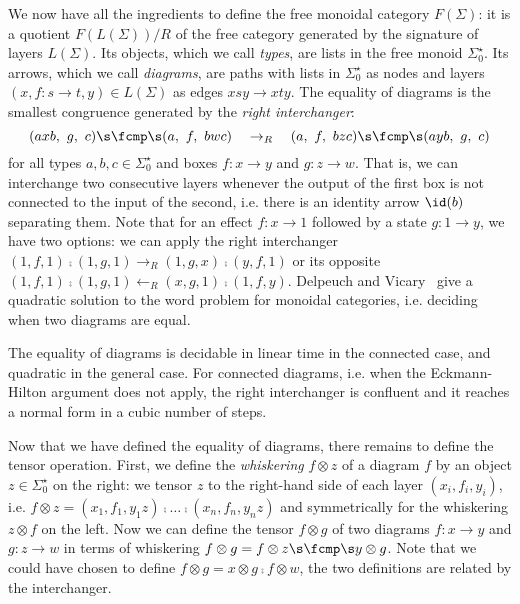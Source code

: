 We now have all the ingredients to define the free monoidal category $F(\Sigma)$: it is a quotient $F(L(\Sigma)) / R$ of the free category generated by the signature of layers $L(\Sigma)$.
Its objects, which we call \emph{types}, are lists in the free monoid $\Sigma_0^\star$.
Its arrows, which we call \emph{diagrams}, are paths with lists in $\Sigma_0^\star$ as nodes and layers $(x, f : s \to t, y) \in L(\Sigma)$ as edges $x s y \to x t y$.
The equality of diagrams is the smallest congruence generated by the \emph{right interchanger}:
$$
(a x b, \ g, \ c) \s \fcmp \s (a, \ f, \ b w c)
\quad \to_R \quad
(a, \ f, \ b z c) \s \fcmp \s (a y b, \ g, \ c)
$$
for all types $a, b, c \in \Sigma_0^\star$ and boxes $f : x \to y$ and $g : z \to w$.
That is, we can interchange two consecutive layers whenever the output of the first box is not connected to the input of the second, i.e. there is an identity arrow $\id(b)$ separating them.
Note that for an effect $f : x \to 1$ followed by a state $g : 1 \to y$, we have two options: we can apply the right interchanger $(1, f, 1) \fcmp (1, g, 1) \to_R (1, g, x) \fcmp (y, f, 1)$ or its opposite $(1, f, 1) \fcmp (1, g, 1) \leftarrow_R (x, g, 1) \fcmp (1, f, y)$.
Delpeuch and Vicary~\cite{DelpeuchVicary18} give a quadratic solution to the word problem for monoidal categories, i.e. deciding when two diagrams are equal.

\begin{theorem}
The equality of diagrams is decidable in linear time in the connected case, and quadratic in the general case.
For connected diagrams, i.e. when the Eckmann-Hilton argument does not apply, the right interchanger is confluent and it reaches a normal form in a cubic number of steps.
\end{theorem}

Now that we have defined the equality of diagrams, there remains to define the tensor operation.
First, we define the \emph{whiskering} $f \otimes z$ of a diagram $f$ by an object $z \in \Sigma_0^\star$ on the right: we tensor $z$ to the right-hand side of each layer $(x_i, f_i, y_i)$, i.e. $f \otimes z = (x_1, f_1, y_1 z) \fcmp \dots \fcmp (x_n, f_n, y_n z)$ and symmetrically for the whiskering $z \otimes f$ on the left.
Now we can define the tensor $f \otimes g$ of two diagrams $f : x \to y$ and $g : z \to w$ in terms of whiskering $f \otimes g = f \otimes z \s \fcmp \s y \otimes g$.
Note that we could have chosen to define $f \otimes g = x \otimes g \fcmp f \otimes w$, the two definitions are related by the interchanger.


